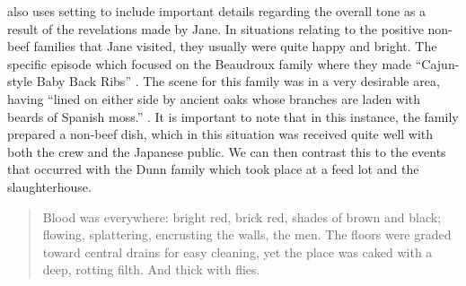 \documentclass{article}
\begin{document}

\citeauthor{ozeki1998my} also uses setting to include important details
regarding the overall tone as a result of the revelations made by Jane. In
situations relating to the positive non-beef families that Jane visited,
they usually were quite happy and bright. The specific episode which focused
on the Beaudroux family where they made ``Cajun-style Baby Back Ribs''
\cite[Ch. 4]{ozeki1998my}. The scene for this family was in a very desirable
area, having ``lined on either side by ancient oaks whose branches are laden
with beards of Spanish moss.'' \cite[Ch. 4]{ozeki1998my}. It is important to
note that in this instance, the family prepared a non-beef dish, which in
this situation was received quite well with both the crew and the Japanese
public. We can then contrast this to the events that occurred with the Dunn
family which took place at a feed lot and the slaughterhouse.

\begin{quote}
Blood was everywhere: bright red, brick red, shades of brown and black;
flowing, splattering, encrusting the walls, the men. The floors were graded
toward central drains for easy cleaning, yet the place was caked with a
deep, rotting filth. And thick with flies. \cite[Ch. 10]{ozeki1998my}
\end{quote}
\end{document}

